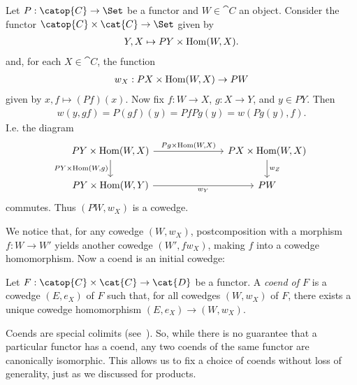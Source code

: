 \begin{example}\label{ex:cowedge}
  Let $P:\catop{C}\to\Set$ be a functor and $W\in\cat{C}$ an object. Consider the functor
  $\catop{C}\times\cat{C}\to\Set$ given by
  \begin{align*}
    Y,X \mapsto PY \times \operatorname{Hom}(W,X).
  \end{align*}
  and, for each $X\in\cat{C}$, the function
  \begin{align*}
    w_X : PX \times \operatorname{Hom}(W,X) \to PW
  \end{align*}
  given by $x,f\mapsto (Pf)(x)$. Now fix $f:W\to X$, $g:X\to Y$, and $y\in PY$.
  Then
  \begin{align*}
    w(y,gf) = P(gf)(y) = PfPg(y) = w(Pg(y), f).
  \end{align*}
  I.e. the diagram
  \begin{equation*}
    \begin{tikzcd}
      {PY\times\text{Hom}(W,X)} &&& {PX\times\text{Hom}(W,X)} \\
      {PY\times\text{Hom}(W,Y)} &&& PW
      \arrow["{Pg\times\text{Hom}(W,X)}", from=1-1, to=1-4]
      \arrow["{PY\times\text{Hom}(W,g)}"', from=1-1, to=2-1]
      \arrow["{w_Y}"', from=2-1, to=2-4]
      \arrow["{w_Z}", from=1-4, to=2-4]
    \end{tikzcd}
  \end{equation*}
  commutes. Thus $(PW, w_X)$ is a cowedge.
\end{example}

We notice that, for any cowedge $(W,w_X)$, postcomposition with a morphism
$f:W\to W'$ yields another cowedge $(W',fw_X)$, making $f$ into a cowedge
homomorphism. Now a coend is an initial cowedge:

\begin{definition}\label{def:coend}
  Let $F:\catop{C}\times\cat{C}\to\cat{D}$ be a functor. A \emph{coend of $F$}
  is a cowedge $(E,e_X)$ of $F$ such that, for all cowedges $(W,w_X)$ of $F$,
  there exists a unique cowedge homomorphism $(E,e_X)\to(W,w_X)$.
\end{definition}

Coends are special colimits (see~\cite[Remark 1.2.3]{loregian2015}). So, while
there is no guarantee that a particular functor has a coend, any two coends of
the same functor are canonically isomorphic. This allows us to fix a choice of
coends without loss of generality, just as we discussed for products.

